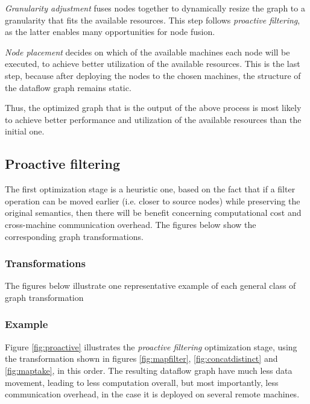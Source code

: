 \documentclass[sigplan,review,anonymous]{acmart}\settopmatter{printfolios=true,printacmref=false}
\begin{document}
\textit{Granularity adjustment} fuses nodes together to dynamically resize the graph to a granularity that fits the available resources. This step follows \textit{proactive filtering}, as the latter enables many opportunities for node fusion.

\textit{Node placement} decides on which of the available machines each node will be executed, to achieve better utilization of the available resources. This is the last step, because after deploying the nodes to the chosen machines, the structure of the dataflow graph remains static.

Thus, the optimized graph that is the output of the above process is most likely to achieve better performance and utilization of the available resources than the initial one.

\subsection{Proactive filtering}

The first optimization stage is a heuristic one, based on the fact that if a filter operation can be moved earlier (i.e. closer to source nodes) while preserving the original semantics, then there will be benefit concerning computational cost and cross-machine communication overhead. The figures below show the corresponding graph transformations.

\subsubsection{Transformations}

The figures below illustrate one representative example of each general class of graph transformation


\newpage
\subsubsection{Example}

Figure \ref{fig:proactive} illustrates the \textit{proactive filtering} optimization stage, using the transformation shown in figures \ref{fig:mapfilter}, \ref{fig:concatdistinct} and \ref{fig:maptake}, in this order. The resulting dataflow graph have much less data movement, leading to less computation overall, but most importantly, less communication overhead, in the case it is deployed on several remote machines.
\end{document}
